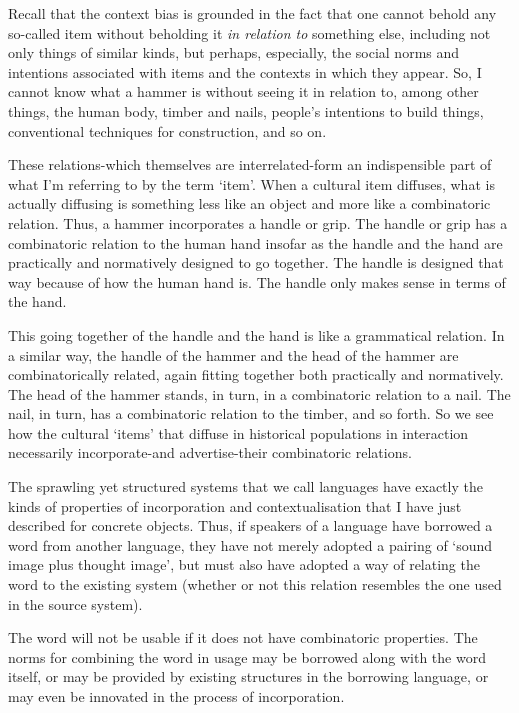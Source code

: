 Recall that the context bias is grounded in the fact that one cannot 
behold any so-called item without beholding it \textit{in relation to }
something else, including not only things of similar kinds, but perhaps, 
especially, the social norms and intentions associated with items and 
the contexts in which they appear. So, I cannot know what a hammer is 
without seeing it in relation to, among other things, the human body, 
timber and nails, people's intentions to build things, conventional 
techniques for construction, and so on. 



These relations-which themselves are interrelated-form an indispensible 
part of what I'm referring to by the term \textquoteleft item'. When a cultural item 
diffuses, what is actually diffusing is something less like an object 
and more like a combinatoric relation. Thus, a hammer incorporates a 
handle or grip. The handle or grip has a combinatoric relation to the 
human hand insofar as the handle and the hand are practically and 
normatively designed to go together. The handle is designed that way 
because of how the human hand is. The handle only makes sense in terms 
of the hand. 



This going together of the handle and the hand is like a grammatical 
relation. In a similar way, the handle of the hammer and the head of the 
hammer are combinatorically related, again fitting together both 
practically and normatively. The head of the hammer stands, in turn, in 
a combinatoric relation to a nail. The nail, in turn, has a combinatoric 
relation to the timber, and so forth. So we see how the cultural \textquoteleft items' 
that diffuse in historical populations in interaction necessarily 
incorporate-and advertise-their combinatoric relations. 



The sprawling yet structured systems that we call languages have exactly 
the kinds of properties of incorporation and contextualisation that I 
have just described for concrete objects. Thus, if speakers of a 
language have borrowed a word from another language, they have not 
merely adopted a pairing of \textquoteleft sound image plus thought image', but must 
also have adopted a way of relating the word to the existing system 
(whether or not this relation resembles the one used in the source 
system). 



The word will not be usable if it does not have combinatoric properties. 
The norms for combining the word in usage may be borrowed along with the 
word itself, or may be provided by existing structures in the borrowing 
language, or may even be innovated in the process of incorporation. 



